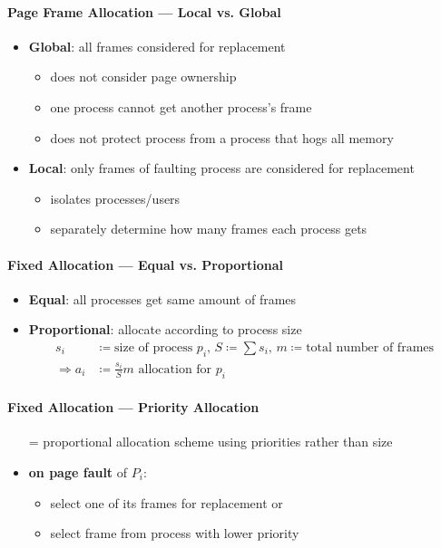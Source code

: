 \paragraph{Page Frame Allocation --- Local vs. Global}
\begin{itemize}
  \item \textbf{Global}: all frames considered for replacement
  \begin{itemize}
    \item does not consider page ownership
    \item one process cannot get another process's frame
    \item does not protect process from a process that hogs all memory
  \end{itemize}
  \item \textbf{Local}: only frames of faulting process are considered for replacement
  \begin{itemize}
    \item isolates processes/users
    \item separately determine how many frames each process gets
  \end{itemize}
\end{itemize}

\paragraph{Fixed Allocation --- Equal vs. Proportional}
\begin{itemize}
  \item \textbf{Equal}: all processes get same amount of frames
  \item \textbf{Proportional}: allocate according to process size
  \begin{align*}
    s_i &\coloneqq \text{size of process } p_i \text{, } S \coloneqq \sum s_i \text{, } m \coloneqq \text{total number of frames } \\
    \Rightarrow a_i &\coloneqq \frac{s_i}{S}m \text{ allocation for } p_i
  \end{align*}
\end{itemize}

\paragraph{Fixed Allocation --- Priority Allocation}
\begin{itemize}
  \item[=] proportional allocation scheme using priorities rather than size
  \item \textbf{on page fault} of $ P_i $:
  \begin{itemize}
    \item select one of its frames for replacement or
    \item select frame from process with lower priority
  \end{itemize}
\end{itemize}

